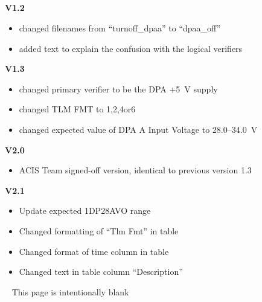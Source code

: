 \documentclass[11pt]{article}
\begin{document}
\normalsize
{} \\
\normalsize


\normalsize
{} \\
\normalsize



\vspace{0.15in}
\normalsize
{} \\
\normalsize

\normalsize
{} \\
\normalsize

{\bf V1.2}
\begin{itemize}
\item changed filenames from ``turnoff\_dpaa'' to
``dpaa\_off''
\item added text to explain the confusion with the logical verifiers
\end{itemize}

{\bf V1.3}
\begin{itemize}
\item changed primary verifier to be the DPA +5~V supply
\item changed TLM FMT to 1,2,4or6
\item changed expected value of DPA A Input Voltage to 28.0--34.0~V
\end{itemize}

{\bf V2.0}
\begin{itemize}
\item ACIS Team signed-off version, identical to previous version 1.3
\end{itemize}

{\bf V2.1}
\begin{itemize}
\item Update expected 1DP28AVO range
\item Changed formatting of ``Tlm Fmt'' in table
\item Changed format of time column in table
\item Changed text in table column ``Description''
\end{itemize}

\newpage\
\vspace{0.4\textheight}
\bc This page is intentionally blank \ec

\newcommand{\tablecaptiontext}{TURN OFF DPA A (realtime version)}

\end{document}
